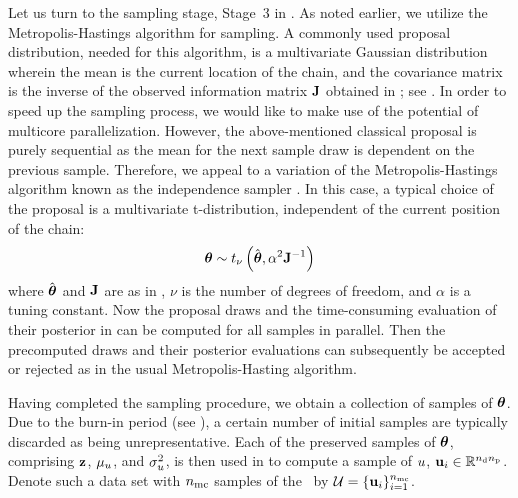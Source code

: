 Let us turn to the sampling stage, Stage~3 in . As noted earlier, we utilize the Metropolis-Hastings algorithm for sampling.
A commonly used proposal distribution, needed for this algorithm, is a multivariate Gaussian distribution wherein the mean is the current location of the chain, and the covariance matrix is the inverse of the observed information matrix $\mathbf{J}$ obtained in ; see \cite{gelman2004, bernardo2007}.
In order to speed up the sampling process, we would like to make use of the potential of multicore parallelization. However, the above-mentioned classical proposal is purely sequential as the mean for the next sample draw is dependent on the previous sample. Therefore, we appeal to a variation of the Metropolis-Hastings algorithm known as the independence sampler \cite{gelman2004}. In this case, a typical choice of the proposal is a multivariate t-distribution, independent of the current position of the chain:
\begin{equation} \elabel{proposal}
  \vparam \sim \studentst{\nu}{\hat{\vparam}}{\alpha^2 \mOI^{-1}}
\end{equation}
where $\hat{{\boldsymbol\theta}}$ and $\mathbf{J}$ are as in , $\nu$ is the number of degrees of freedom, and $\alpha$ is a tuning constant. Now the proposal draws and the time-consuming evaluation of their posterior in  can be computed for all samples in parallel.
Then the precomputed draws and their posterior evaluations can subsequently be accepted or rejected as in the usual Metropolis-Hasting algorithm.

Having completed the sampling procedure, we obtain a collection of samples of ${\boldsymbol\theta}$. Due to the burn-in period (see ), a certain number of initial samples are typically discarded as being unrepresentative.
Each of the preserved samples of ${\boldsymbol\theta}$, comprising $\mathbf{z}$, $\mu_u$, and $\sigma^2_u$, is then used in  to compute a sample of $u$, $\mathbf{u}_i \in \mathbb{R}^{{n_\text{d}} {n_\text{p}}}$.
Denote such a data set with ${n_\text{mc}}$ samples of the \qoi\ by $\mathcal{U} = \{ \mathbf{u}_i \}_{i = 1}^{n_\text{mc}}$.
